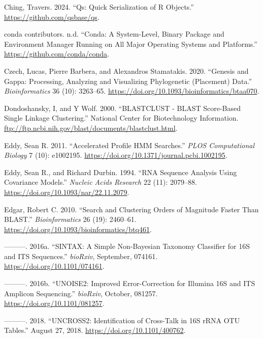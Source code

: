 \documentclass[
]{article}
\newlength{\cslhangindent}
\newenvironment{CSLReferences}[2] %
 {\begin{list}{}{%
  \setlength{\itemindent}{0pt}
  \setlength{\leftmargin}{0pt}
  \setlength{\parsep}{0pt}
  \ifodd #1
   \setlength{\leftmargin}{\cslhangindent}
   \setlength{\itemindent}{-1\cslhangindent}
  \fi
  \setlength{\itemsep}{#2\baselineskip}}}
 {\end{list}}
\begin{document}
\begin{CSLReferences}{1}{0}
Ching, Travers. 2024. {``Qs: {Quick} Serialization of {R} Objects.''} \url{https://github.com/qsbase/qs}.

conda contributors. n.d. {``Conda: {A} System-Level, Binary Package and Environment Manager Running on All Major Operating Systems and Platforms.''} \url{https://github.com/conda/conda}.

Czech, Lucas, Pierre Barbera, and Alexandros Stamatakis. 2020. {``Genesis and {Gappa}: Processing, Analyzing and Visualizing Phylogenetic (Placement) Data.''} \emph{Bioinformatics} 36 (10): 3263--65. \url{https://doi.org/10.1093/bioinformatics/btaa070}.

Dondoshansky, I, and Y Wolf. 2000. {``{BLASTCLUST} - {BLAST} Score-Based Single Linkage Clustering.''} National Center for Biotechnology Information. \url{ftp://ftp.ncbi.nih.gov/blast/documents/blastclust.html}.

Eddy, Sean R. 2011. {``Accelerated {Profile HMM Searches}.''} \emph{PLOS Computational Biology} 7 (10): e1002195. \url{https://doi.org/10.1371/journal.pcbi.1002195}.

Eddy, Sean R., and Richard Durbin. 1994. {``{RNA} Sequence Analysis Using Covariance Models.''} \emph{Nucleic Acids Research} 22 (11): 2079--88. \url{https://doi.org/10.1093/nar/22.11.2079}.

Edgar, Robert C. 2010. {``Search and Clustering Orders of Magnitude Faster Than {BLAST}.''} \emph{Bioinformatics} 26 (19): 2460--61. \url{https://doi.org/10.1093/bioinformatics/btq461}.

---------. 2016a. {``{SINTAX}: A Simple Non-{Bayesian} Taxonomy Classifier for {16S} and {ITS} Sequences.''} \emph{bioRxiv}, September, 074161. \url{https://doi.org/10.1101/074161}.

---------. 2016b. {``{UNOISE2}: Improved Error-Correction for {Illumina 16S} and {ITS} Amplicon Sequencing.''} \emph{bioRxiv}, October, 081257. \url{https://doi.org/10.1101/081257}.

---------. 2018. {``{UNCROSS2}: Identification of Cross-Talk in {16S rRNA OTU} Tables.''} August 27, 2018. \url{https://doi.org/10.1101/400762}.


\end{CSLReferences}
\end{document}

